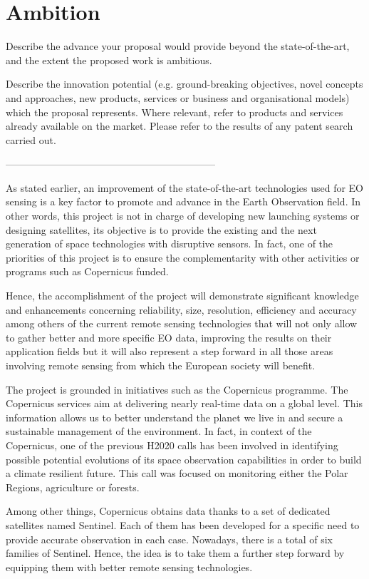 \section{Ambition}

Describe the advance your proposal would provide beyond the state-of-the-art, and the extent the proposed work is ambitious.

Describe the innovation potential (e.g. ground-breaking objectives, novel concepts and approaches, new products, services or business and organisational models) which the proposal represents. Where relevant, refer to products and services already available on the market. Please refer to the results of any patent search carried out.

---------------------------------------------------------------

As stated earlier, an improvement of the state-of-the-art technologies used for EO sensing is a key factor to promote and advance in the Earth Observation field. In other words, this project is not in charge of developing new launching systems or designing satellites, its objective is to provide the existing and the next generation of space technologies with disruptive sensors. In fact, one of the priorities of this project is to ensure the complementarity with other activities or programs such as Copernicus funded.

Hence, the accomplishment of the project will demonstrate significant knowledge and enhancements concerning reliability, size, resolution, efficiency and accuracy among others of the current remote sensing technologies that will not only allow to gather better and more specific EO data, improving the results on their application fields but it will also represent a step forward in all those areas involving remote sensing from which the European society will benefit. 

The project is grounded in initiatives such as the Copernicus programme. The Copernicus services aim at delivering nearly real-time data on a global level. This information allows us to better understand the planet we live in and secure a sustainable management of the environment. In fact, in context of the Copernicus, one of the previous H2020 calls has been involved in identifying possible potential evolutions of its space observation capabilities in order to build a climate resilient future. This call was focused on monitoring either the Polar Regions, agriculture or forests.

Among other things, Copernicus obtains data thanks to a set of dedicated satellites named Sentinel. Each of them has been developed for a specific need to provide accurate observation in each case. Nowadays, there is a total of six families of Sentinel. Hence, the idea is to take them a further step forward by equipping them with better remote sensing technologies. 